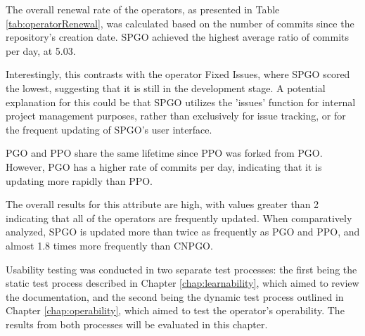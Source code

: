
The overall renewal rate of the operators, as presented in Table \ref{tab:operatorRenewal}, was calculated based on the number of commits since the repository's creation date. SPGO achieved the highest average ratio of commits per day, at 5.03.

Interestingly, this contrasts with the operator Fixed Issues, where SPGO scored the lowest, suggesting that it is still in the development stage.
A potential explanation for this could be that SPGO utilizes the 'issues' function for internal project management purposes,
rather than exclusively for issue tracking, or for the frequent updating of SPGO’s user interface.

PGO and PPO share the same lifetime since PPO was forked from PGO. However, PGO has a higher rate of commits per day, indicating that it is updating more rapidly than PPO.

The overall results for this attribute are high, with values greater than 2 indicating that all of the operators are frequently updated.
When comparatively analyzed, SPGO is updated more than twice as frequently as PGO and PPO, and almost 1.8 times more frequently than CNPGO.


Usability testing was conducted in two separate test processes: the first being the static test process described in Chapter \ref{chap:learnability}, which aimed to review the documentation,
and the second being the dynamic test process outlined in Chapter \ref{chap:operability}, which aimed to test the operator's operability.
The results from both processes will be evaluated in this chapter.

